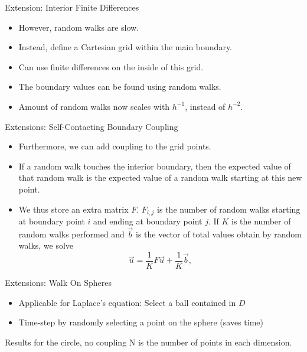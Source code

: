 \documentclass{beamer}
\newcommand\mat[1]{#1}
\begin{document}
\begin{frame}{Extension: Interior Finite Differences}
\begin{itemize}
\item However, random walks are slow.
\item Instead, define a Cartesian grid within the main boundary.
\item Can use finite differences on the inside of this grid.
\item The boundary values can be found using random walks.
\item Amount of random walks now scales with $h^{-1}$, instead of $h^{-2}$.
\end{itemize}
\end{frame}

\begin{frame}{Extensions: Self-Contacting Boundary Coupling}
\begin{itemize}
\item Furthermore, we can add coupling to the grid points.
\item If a random walk touches the interior boundary,
then the expected value of that random walk
is the expected value of a random walk starting at this new point.
\item We thus store an extra matrix $\mat{F}$.
$F_{i,j}$ is the number of random walks starting at boundary point $i$
and ending at boundary point $j$.
If $K$ is the number of random walks performed
and $\vec{b}$ is the vector of total values obtain by random walks,
we solve
$$\vec{u}=\frac{1}{K}\mat{F}\vec{u}+\frac{1}{K}\vec{b},$$
\end{itemize}
\end{frame}

\begin{frame}{Extensions: Walk On Spheres}
\begin{itemize}
	\item Applicable for Laplace's equation: Select a ball contained in $D$ 
	\item Time-step by randomly selecting a point on the sphere (saves time)
\end{itemize}
\end{frame}
Results for the circle, no coupling
N is the number of points in each dimension.
\end{document}
